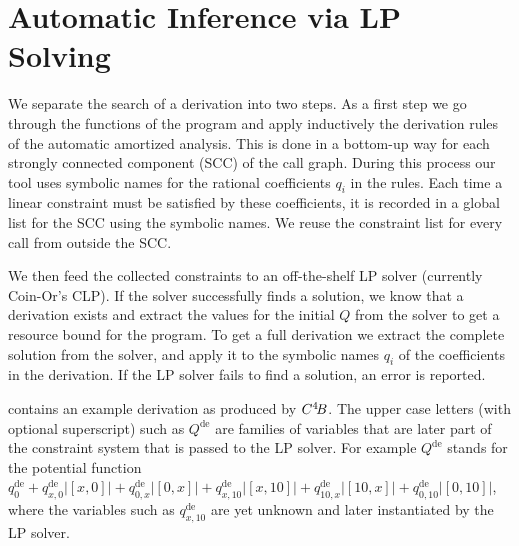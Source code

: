 \documentclass[nocopyrightspace,preprint,pldi]{sigplanconf-pldi15}
\newcommand{\ifshort}[2]{\ifx\fullversion\undefined{#1}\else{#2}\fi}
\newcommand{\sectskip}[0]{\ifshort{\vspace{-3pt}}{}}
\newcommand{\aftersectskip}[0]{\ifshort{\vspace{-1pt}}{}}
\newcommand{\pref}[1]{\prettyref{#1}}
\begin{document}
\sectskip
\section{Automatic Inference via LP Solving}
\label{sec:lp}
\aftersectskip

We separate the search of a derivation into two steps.  As a first
step we go through the functions of the program and apply inductively
the derivation rules of the automatic amortized analysis.  This is
done in a bottom-up way for each strongly connected component (SCC) of the
call graph.  During this
process our tool uses symbolic names for the rational coefficients
$q_i$ in the rules.  Each time a linear constraint must be
satisfied by these coefficients, it is recorded in a global list for the SCC using
the symbolic names.  We reuse the constraint list for
every call from outside the SCC.


We then feed the collected constraints to an
off-the-shelf LP solver (currently Coin-Or's CLP).
If the solver successfully finds a solution, we know that a derivation
exists and extract the values for the initial
$Q$ from the solver to get a resource bound for the program.  To get
a full derivation we extract the complete solution from the
solver, and apply it to the symbolic names $q_i$ of the coefficients
in the derivation.  If the LP solver fails to find a solution, an
error is reported.

\pref{fig:derivation} contains an example derivation as produced
by $C^4\!B$.  The upper case letters (with optional
superscript) such as $Q^\text{de}$ are families of
variables that are later part of the constraint system that is passed
to the LP solver.  For example $Q^\text{de}$ stands for the potential
function $q^\text{de}_0 + q^\text{de}_{x,0} |[x,0]| +
q^\text{de}_{0,x} |[0,x]| + q^\text{de}_{x,10} |[x,10]| +
q^\text{de}_{10,x} |[10,x]| + q^\text{de}_{0,10} |[0,10]|$, where the
variables such as $q^\text{de}_{x,10}$ are yet unknown and later
instantiated by the LP solver.
\end{document}
